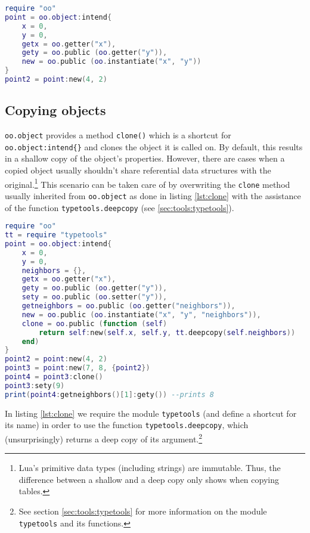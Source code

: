 \begin{lstlisting}[language=lua, caption={Rewriting listing \ref{lst:instantiate} using \texttt{oo.getter}}, label=lst:getter, name=lst:getter]
require "oo"
point = oo.object:intend{
	x = 0,
	y = 0,
	getx = oo.getter("x"),
	gety = oo.public (oo.getter("y")),
	new = oo.public (oo.instantiate("x", "y"))
}
point2 = point:new(4, 2)
\end{lstlisting}

\subsection{Copying objects}
\label{sec:oo:copying}
\texttt{oo.object} provides a method \texttt{clone()} which is a shortcut for \texttt{oo.object:intend\{\}} and clones the object it is called on. By default, this results in a shallow copy of the object's properties. However, there are cases when a copied object usually shouldn't share referential data structures with the original.\footnote{Lua's primitive data types (including strings) are immutable. Thus, the difference between a shallow and a deep copy only shows when copying tables.} This scenario can be taken care of by overwriting the \texttt{clone} method usually inherited from \texttt{oo.object} as done in listing \ref{lst:clone} with the assistance of the function \texttt{typetools.deepcopy} (see \ref{sec:tools:typetools}).

\begin{lstlisting}[language=lua, caption={Overwriting the \texttt{clone} method}, label=lst:clone, name=lst:clone]
require "oo"
tt = require "typetools"
point = oo.object:intend{
	x = 0,
	y = 0,
	neighbors = {},
	getx = oo.getter("x"),
	gety = oo.public (oo.getter("y")),
	sety = oo.public (oo.setter("y")),
	getneighbors = oo.public (oo.getter("neighbors")),
	new = oo.public (oo.instantiate("x", "y", "neighbors")),
	clone = oo.public (function (self)
		return self:new(self.x, self.y, tt.deepcopy(self.neighbors))
	end)
}
point2 = point:new(4, 2)
point3 = point:new(7, 8, {point2})
point4 = point3:clone()
point3:sety(9)
print(point4:getneighbors()[1]:gety()) --prints 8

\end{lstlisting}

In listing \ref{lst:clone} we require the module \texttt{typetools} (and define a shortcut for its name) in order to use the function \texttt{typetools.deepcopy}, which (unsurprisingly) returns a deep copy of its argument.\footnote{See section \ref{sec:tools:typetools} for more information on the module \texttt{typetools} and its functions.}

